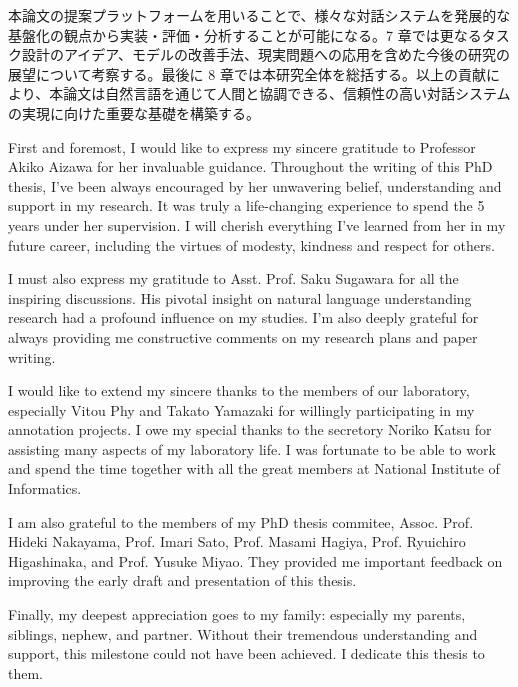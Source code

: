 \documentclass[doctor,11pt,final]{iscs-thesis}
\begin{document}
\begin{jabstract}
本論文の提案プラットフォームを用いることで、様々な対話システムを発展的な基盤化の観点から実装・評価・分析することが可能になる。7 章では更なるタスク設計のアイデア、モデルの改善手法、現実問題への応用を含めた今後の研究の展望について考察する。最後に 8 章では本研究全体を総括する。以上の貢献により、本論文は自然言語を通じて人間と協調できる、信頼性の高い対話システムの実現に向けた重要な基礎を構築する。

\end{jabstract}

\maketitle


\begin{acknowledge}

First and foremost, I would like to express my sincere gratitude to Professor Akiko Aizawa for her invaluable guidance. Throughout the writing of this PhD thesis, I've been always encouraged by her unwavering belief, understanding and support in my research. It was truly a life-changing experience to spend the 5 years under her supervision. I will cherish everything I've learned from her in my future career, including the virtues of modesty, kindness and respect for others.

I must also express my gratitude to Asst. Prof. Saku Sugawara for all the inspiring discussions. His pivotal insight on natural language understanding research had a profound influence on my studies. I'm also deeply grateful for always providing me constructive comments on my research plans and paper writing.

I would like to extend my sincere thanks to the members of our laboratory, especially Vitou Phy and Takato Yamazaki for willingly participating in my annotation projects. I owe my special thanks to the secretory Noriko Katsu for assisting many aspects of my laboratory life. I was fortunate to be able to work and spend the time together with all the great members at National Institute of Informatics.

I am also grateful to the members of my PhD thesis commitee, Assoc. Prof. Hideki Nakayama, Prof. Imari Sato, Prof. Masami Hagiya, Prof. Ryuichiro Higashinaka, and Prof. Yusuke Miyao. They provided me important feedback on improving the early draft and presentation of this thesis.

Finally, my deepest appreciation goes to my family: especially my parents, siblings, nephew, and partner. Without their tremendous understanding and support, this milestone could not have been achieved. I dedicate this thesis to them.

\end{acknowledge}
\end{document}
